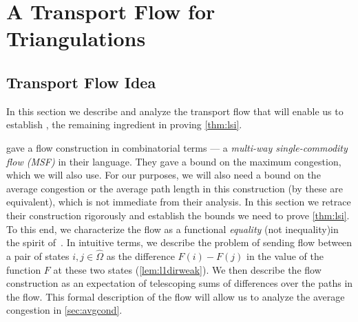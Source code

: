 \documentclass[a4paper, 12p]{article}
\numberwithin{equation}{section}
\newcommand{\FF}{F}
\newcommand{\Omorproj}{\hat{\Omega}}
\begin{document}
\section{A Transport Flow for Triangulations}
\subsection{Transport Flow Idea}
\label{sec:trixport}
In this section we describe and analyze the transport flow that will enable us to establish , 
the remaining ingredient in proving \cref{thm:lsi}.

\cite{eppstein2022improved} gave a flow construction in combinatorial terms --- a \emph{multi-way single-commodity flow (MSF)} in their language. They gave a bound on the maximum congestion, which we will also use. For our purposes, we will also need a bound on the average congestion or the average path length in this construction (by \cite{montenegrovc} these are equivalent), which is not immediate from their analysis. In this section we retrace their construction rigorously and establish the bounds we need to prove \cref{thm:lsi}. To this end, we characterize the flow as a functional \emph{equality} (not inequality)\textemdash in the spirit of~\cite{diacstroock}. In intuitive terms,  we describe the problem of sending flow between a pair of states $i,j\in\Omorproj$ as the difference $\FF(i) - \FF(j)$ in the value of the function $\FF$ at these two states (\cref{lem:l1dirweak}). We then describe the flow construction as an expectation of telescoping sums of differences over the paths in the flow. This formal description of the flow will allow us to analyze the average congestion in \cref{sec:avgcond}.
\end{document}
